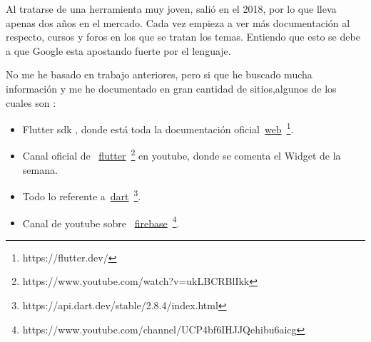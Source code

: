 
Al tratarse de una herramienta muy joven, salió en el 2018, por lo que lleva apenas dos años en el mercado. Cada vez empieza a ver más documentación al respecto, cursos y foros en los que se tratan los temas. Entiendo que esto se debe a que Google esta apostando fuerte por el lenguaje. 

No me he basado en trabajo anteriores, pero si que he buscado mucha información y me he documentado en gran cantidad de sitios,algunos de los cuales son :


\begin{itemize}
	\item Flutter sdk , donde está toda la documentación oficial~\href{https://flutter.dev/}{web}~\footnote{https://flutter.dev/}.
	\item Canal oficial de  ~\href{https://www.youtube.com/watch?v=ukLBCRBlIkk&list=PLjxrf2q8roU1kMpfyJ4EY0pID2oRHtvGm}{flutter}~\footnote{https://www.youtube.com/watch?v=ukLBCRBlIkk} en youtube, donde se comenta el Widget de la semana.
	\item Todo lo referente a~\href{https://api.dart.dev/stable/2.8.4/index.html}{dart}~\footnote{https://api.dart.dev/stable/2.8.4/index.html}.
	\item Canal de youtube sobre ~\href{https://www.youtube.com/channel/UCP4bf6IHJJQehibu6ai__cg}{firebase}~\footnote{https://www.youtube.com/channel/UCP4bf6IHJJQehibu6aicg}.
\end{itemize}